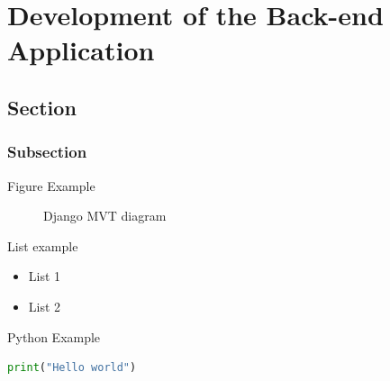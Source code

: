 \chapter{Development of the Back-end Application}

\section{Section}

\subsection{Subsection}

Figure Example

\begin{figure}[ht!]
  \caption{Django MVT diagram}
  \label{fig:mvt_architecture}
\end{figure}


List example

\medskip

\begin{itemize}
    \item List 1
    \item List 2
\end{itemize}

\medskip

Python Example

\begin{lstlisting}[language=Python]
print("Hello world")
\end{lstlisting}

\medskip